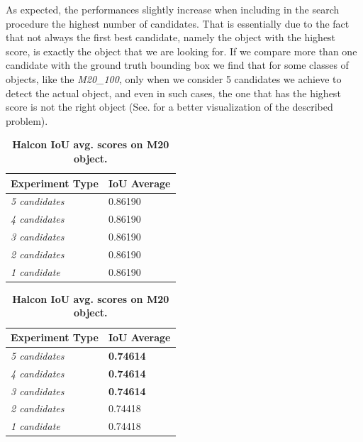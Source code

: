 As expected, the performances slightly increase when including in the search procedure the highest number of candidates. That is essentially due to the fact that not always the first best candidate, namely the object with the highest score, is exactly the object that we are looking for. If we compare more than one candidate with the ground truth bounding box we find that for some classes of objects, like the \emph{M20\_100}, only when we consider 5 candidates we achieve to detect the actual object, and even in such cases, the one that has the highest score is not the right object (See.  for a better visualization of the described problem).

\begin{table}[!hbt]
\parbox{.45\linewidth}{
	\centering
    \begin{tabular}{| l | l |}
    \hline
    \textbf{Experiment Type} & \textbf{IoU Average} \\ \hline
    \emph{5 candidates} & 0.86190 \\
    \emph{4 candidates} & 0.86190 \\
    \emph{3 candidates} & 0.86190 \\
    \emph{2 candidates} & 0.86190 \\
    \emph{1 candidate} & 0.86190 \\
    \hline
    \end{tabular}
    \caption{\textbf{Halcon IoU avg. scores on Distance\_tube object.}}
    \label{tab:halcon_distance_tube_results}
}
\hfill
\parbox{.45\linewidth}{
	\centering
    \begin{tabular}{| l | l |}
    \hline
    \textbf{Experiment Type} & \textbf{IoU Average} \\ \hline
    \emph{5 candidates} & \textbf{0.74614} \\
    \emph{4 candidates} & \textbf{0.74614} \\
    \emph{3 candidates} & \textbf{0.74614} \\
    \emph{2 candidates} & 0.74418\\
    \emph{1 candidate} & 0.74418\\
    \hline
    \end{tabular}
    \caption{\textbf{Halcon IoU avg. scores on M20 object.}}
    \label{tab:halcon_M20_results}
}
\end{table}

